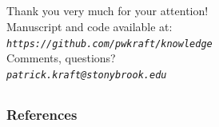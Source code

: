 \documentclass{beamer}
\begin{document}

\subsection{}
\begin{frame}%
  \begin{center}
  \large{Thank you very much for your attention!}\\ \vspace{2em}
  Manuscript and code available at:\\
  \emph{\texttt{https://github.com/pwkraft/knowledge}}\\ \vspace{2em}
  Comments, questions?\\
  \emph{\texttt{patrick.kraft@stonybrook.edu}}
  \end{center}
\end{frame}

\subsection{}
\begin{frame}
  \frametitle{References}
  \def\newblock{\hskip .11em plus .33em minus .07em}
  \begin{scriptsize}
    
    
  \end{scriptsize}
\end{frame}
\end{document}

